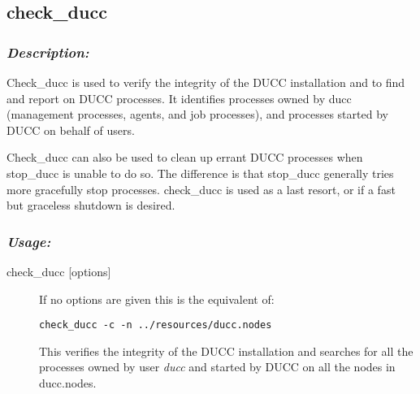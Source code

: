 \subsection{check\_ducc}
\label{subsec:admin.check-ducc}
    \subsubsection{{\em Description:}}

    Check\_ducc is used to verify the integrity of the DUCC installation and to find and report on
    DUCC processes. It identifies processes owned by ducc (management processes, agents,
    and job processes), and processes started by DUCC on behalf of users.
    
    Check\_ducc can also be used to clean up errant DUCC processes when stop\_ducc is unable 
    to do so. The difference is that stop\_ducc generally tries more gracefully stop processes. 
    check\_ducc is used as a last resort, or if a fast but graceless shutdown is desired. 
    
    \subsubsection{\em{Usage: }}

        \begin{description} 
          \item[check\_ducc {[options]}]
              If no options are given this is the equivalent of: 
\begin{verbatim}
check_ducc -c -n ../resources/ducc.nodes 
\end{verbatim}
              
              This verifies the integrity of the DUCC installation and searches for all the
              processes owned by user {\em ducc} and started by DUCC on all the nodes in ducc.nodes.
        \end{description}
            
